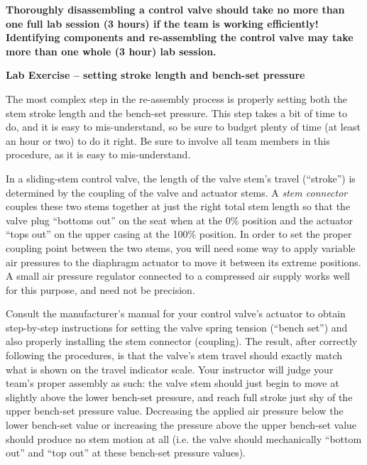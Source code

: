 \vskip 10pt

{\bf Thoroughly disassembling a control valve should take no more than one full lab session (3 hours) if the team is working efficiently!  Identifying components and re-assembling the control valve may take more than one whole (3 hour) lab session.}


\vfil \eject

\noindent
{\bf Lab Exercise -- setting stroke length and bench-set pressure}

\vskip 5pt

The most complex step in the re-assembly process is properly setting both the stem stroke length and the bench-set pressure.  This step takes a bit of time to do, and it is easy to mis-understand, so be sure to budget plenty of time (at least an hour or two) to do it right.  Be sure to involve all team members in this procedure, as it is easy to mis-understand.

In a sliding-stem control valve, the length of the valve stem's travel (``stroke'') is determined by the coupling of the valve and actuator stems.  A {\it stem connector} couples these two stems together at just the right total stem length so that the valve plug ``bottoms out'' on the seat when at the 0\% position and the actuator ``tops out'' on the upper casing at the 100\% position.  In order to set the proper coupling point between the two stems, you will need some way to apply variable air pressures to the diaphragm actuator to move it between its extreme positions.  A small air pressure regulator connected to a compressed air supply works well for this purpose, and need not be precision.

\vskip 10pt

Consult the manufacturer's manual for your control valve's actuator to obtain step-by-step instructions for setting the valve spring tension (``bench set'') and also properly installing the stem connector (coupling).  The result, after correctly following the procedures, is that the valve's stem travel should exactly match what is shown on the travel indicator scale.  Your instructor will judge your team's proper assembly as such: the valve stem should just begin to move at slightly above the lower bench-set pressure, and reach full stroke just shy of the upper bench-set pressure value.  Decreasing the applied air pressure below the lower bench-set value or increasing the pressure above the upper bench-set value should produce no stem motion at all (i.e. the valve should mechanically ``bottom out'' and ``top out'' at these bench-set pressure values).

